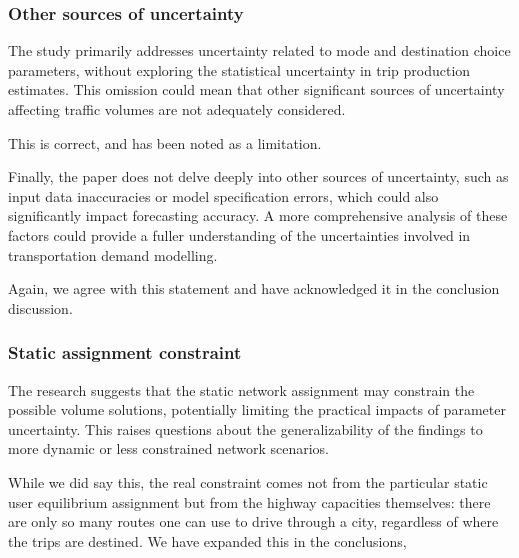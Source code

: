 \documentclass{ar2rc}
\begin{document}
\subsubsection{Other sources of uncertainty}
\RC The study primarily addresses uncertainty related to mode and destination
choice parameters, without exploring the statistical uncertainty in trip
production estimates. This omission could mean that other significant sources
of uncertainty affecting traffic volumes are not adequately considered.

\AR This is correct, and has been noted as a limitation.

 Finally, the paper does not delve deeply into other sources of uncertainty, such
as input data inaccuracies or model specification errors, which could also
significantly impact forecasting accuracy. A more comprehensive analysis of
these factors could provide a fuller understanding of the uncertainties involved
in transportation demand modelling.

\AR Again, we agree with this statement and have acknowledged it in the conclusion discussion. 

\subsubsection{Static assignment constraint}
\RC The research suggests that the static network assignment may constrain the
possible volume solutions, potentially limiting the practical impacts of
parameter uncertainty. This raises questions about the generalizability of the
findings to more dynamic or less constrained network scenarios.

\AR While we did say this, the real constraint comes not from the particular static
user equilibrium assignment but from the highway capacities themselves: there are 
only so many routes one can use to drive through a city, regardless of where the trips
are destined. We have expanded this in the conclusions,
\end{document}
